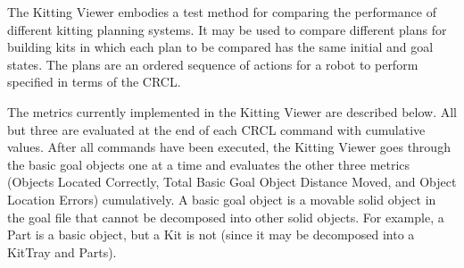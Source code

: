 The Kitting Viewer embodies a test method for comparing the performance of
different kitting planning systems. It may be used to compare different
plans for building kits in which each plan to be compared has the same
initial and goal states. The plans are an ordered sequence of actions for a
robot to perform specified in terms of the CRCL.

The metrics currently implemented in the Kitting Viewer are described below.
All but three are evaluated at the end of each CRCL command with cumulative
values. After all commands have been executed, the Kitting Viewer goes
through the basic goal objects one at a time and evaluates the other three
metrics (Objects Located Correctly, Total Basic Goal Object Distance Moved,
and Object Location Errors) cumulatively. A basic goal object is a movable
solid object in the goal file that cannot be decomposed into other solid
objects. For example, a Part is a basic object, but a Kit is not (since it
may be decomposed into a KitTray and Parts).

